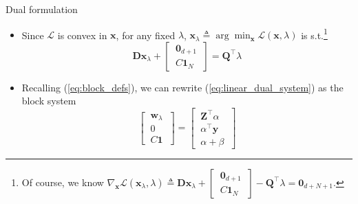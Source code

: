 \documentclass{beamer}
\numberwithin{equation}{section}
\newcommand{\aref}[1]{\alert{\ref{#1}}}
\begin{document}
\begin{frame}{Dual formulation}
    \begin{itemize}
        \item
        Since $ \mathcal{L} $ is convex in $ \mathbf{x} $, for any
        fixed $ \lambda $, $ \mathbf{x}_\lambda \triangleq
        \arg\min_\mathbf{x}\mathcal{L}(\mathbf{x}, \lambda) $ is
        s.t.\footnote{
            Of course, we know $ \nabla_\mathbf{x}\mathcal{L}(
            \mathbf{x}_\lambda, \lambda) \triangleq \mathbf{Dx}_\lambda +            
            \begin{bmatrix}
                \ \mathbf{0}_{d + 1} \ \\ \ C\mathbf{1}_N \
            \end{bmatrix} - \mathbf{Q}^\top\lambda = \mathbf{0}_{d + N + 1} $.
            \vspace{0 pt}
        }
        \begin{equation} \label{eq:linear_dual_system}
            \mathbf{Dx}_\lambda + \begin{bmatrix}
                \ \mathbf{0}_{d + 1} \ \\ \ C\mathbf{1}_N \
            \end{bmatrix} = \mathbf{Q}^\top\lambda
        \end{equation}

        \item
        Recalling (\aref{eq:block_defs}), we can rewrite
        (\aref{eq:linear_dual_system}) as the block system
        \begin{equation} \label{eq:linear_dual_eqs}
            \begin{bmatrix}
                \ \mathbf{w}_\lambda \ \\ \ 0 \ \\ \ C\mathbf{1} \
            \end{bmatrix} = \begin{bmatrix}
                \ \mathbf{Z}^\top\alpha \ \\
                \ \alpha^\top\mathbf{y} \ \\
                \ \alpha + \beta \
            \end{bmatrix}
        \end{equation}


\end{itemize}
\end{frame}
\end{document}
